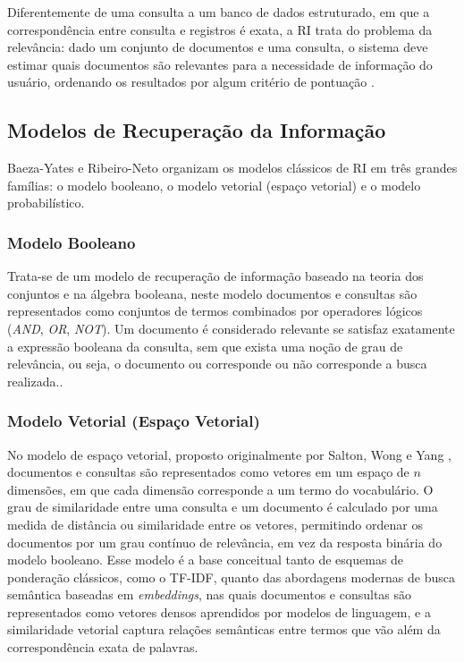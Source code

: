 Diferentemente de uma consulta a um banco de dados estruturado, em que a correspondência entre consulta e registros é exata, a RI trata do problema da relevância: dado um conjunto de documentos e uma consulta, o sistema deve estimar quais documentos são relevantes para a necessidade de informação do usuário, ordenando os resultados por algum critério de pontuação \cite{manning2008ir}.

\subsection{Modelos de Recuperação da Informação}

Baeza-Yates e Ribeiro-Neto \cite{baezayates2010modern} organizam os modelos clássicos de RI em três grandes famílias: o modelo booleano, o modelo vetorial (espaço vetorial) e o modelo probabilístico.

\subsubsection{Modelo Booleano}
Trata-se de um modelo de recuperação de informação baseado na teoria dos conjuntos e na álgebra booleana, neste modelo documentos e consultas são representados como conjuntos de termos combinados por operadores lógicos (\textit{AND}, \textit{OR}, \textit{NOT}). Um documento é considerado relevante se satisfaz exatamente a expressão booleana da consulta, sem que exista uma noção de grau de relevância, ou seja, o documento ou corresponde ou não corresponde a busca realizada.\cite{baezayates2010modern}.

\subsubsection{Modelo Vetorial (Espaço Vetorial)}\label{sec:modelo-vetorial}
No modelo de espaço vetorial, proposto originalmente por Salton, Wong e Yang \cite{salton1975vector}, documentos e consultas são representados como vetores em um espaço de $n$ dimensões, em que cada dimensão corresponde a um termo do vocabulário. O grau de similaridade entre uma consulta e um documento é calculado por uma medida de distância ou similaridade entre os vetores, permitindo ordenar os documentos por um grau contínuo de relevância, em vez da resposta binária do modelo booleano. Esse modelo é a base conceitual tanto de esquemas de ponderação clássicos, como o TF-IDF, quanto das abordagens modernas de busca semântica baseadas em \textit{embeddings}, nas quais documentos e consultas são representados como vetores densos aprendidos por modelos de linguagem, e a similaridade vetorial captura relações semânticas entre termos que vão além da correspondência exata de palavras.

